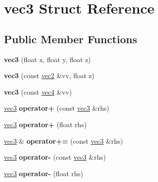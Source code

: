 \hypertarget{structvec3}{\section{vec3 Struct Reference}
\label{structvec3}
}
\subsection*{Public Member Functions}
\begin{DoxyCompactItemize}
\item 
\hypertarget{structvec3_a0c11a1f6ed4c349713657dd3452d6ea3}{{\bfseries vec3} (float x, float y, float z)}\label{structvec3_a0c11a1f6ed4c349713657dd3452d6ea3}

\item 
\hypertarget{structvec3_a0be4c6cdf0d0075143c7f002afbd9197}{{\bfseries vec3} (const \hyperlink{structvec2}{vec2} \&vv, float z)}\label{structvec3_a0be4c6cdf0d0075143c7f002afbd9197}

\item 
\hypertarget{structvec3_ae8b2e6ef16b18f03756310a5ef9eb558}{{\bfseries vec3} (const \hyperlink{structvec4}{vec4} \&vv)}\label{structvec3_ae8b2e6ef16b18f03756310a5ef9eb558}

\item 
\hypertarget{structvec3_a25fa941ef2ec98bc73ca15a33925507b}{\hyperlink{structvec3}{vec3} {\bfseries operator+} (const \hyperlink{structvec3}{vec3} \&rhs)}\label{structvec3_a25fa941ef2ec98bc73ca15a33925507b}

\item 
\hypertarget{structvec3_a316d155c9fd78964d8e6ec7cf5070c66}{\hyperlink{structvec3}{vec3} {\bfseries operator+} (float rhs)}\label{structvec3_a316d155c9fd78964d8e6ec7cf5070c66}

\item 
\hypertarget{structvec3_a44e4b9b0bde42f072846f9629cac67be}{\hyperlink{structvec3}{vec3} \& {\bfseries operator+=} (const \hyperlink{structvec3}{vec3} \&rhs)}\label{structvec3_a44e4b9b0bde42f072846f9629cac67be}

\item 
\hypertarget{structvec3_a5051a7e677837520021df87036e1218b}{\hyperlink{structvec3}{vec3} {\bfseries operator-\/} (const \hyperlink{structvec3}{vec3} \&rhs)}\label{structvec3_a5051a7e677837520021df87036e1218b}

\item 
\hypertarget{structvec3_a4fb748364b6d741fc1a9678f5ccf0c7a}{\hyperlink{structvec3}{vec3} {\bfseries operator-\/} (float rhs)}\label{structvec3_a4fb748364b6d741fc1a9678f5ccf0c7a}


\end{DoxyCompactItemize}
